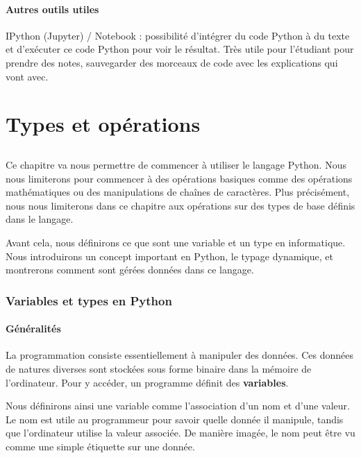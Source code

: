\documentclass[12pt, a4paper]{article}
\begin{document}
\subsection{Autres outils utiles}
IPython (Jupyter) / Notebook : possibilité d'intégrer du code Python à du texte et d'exécuter ce code Python pour voir le résultat. Très utile pour l'étudiant pour prendre des notes, sauvegarder des morceaux de code avec les explications qui vont avec.




\newpage
\part{Types et opérations}
\chapter{}
Ce chapitre va nous permettre de commencer à utiliser le langage Python. Nous nous limiterons pour commencer à des opérations basiques comme des opérations mathématiques ou des manipulations de chaînes de caractères. Plus précisément, nous nous limiterons dans ce chapitre aux opérations sur des types de base définis dans le langage.

Avant cela, nous définirons ce que sont une variable et un type en informatique. Nous introduirons un concept important en Python, le typage dynamique, et montrerons comment sont gérées données dans ce langage.



\section{Variables et types en Python}
\label{sec:variables}

\subsection{Généralités}
La programmation consiste essentiellement à manipuler des données. Ces données de natures diverses sont stockées sous forme binaire dans la mémoire de l'ordinateur. Pour y accéder, un programme définit des \textbf{variables}.

Nous définirons ainsi une variable comme l'association d'un nom et d'une valeur. Le nom est utile au programmeur pour savoir quelle donnée il manipule, tandis que l'ordinateur utilise la valeur associée. De manière imagée, le nom peut être vu comme une simple étiquette sur une donnée.
\end{document}
